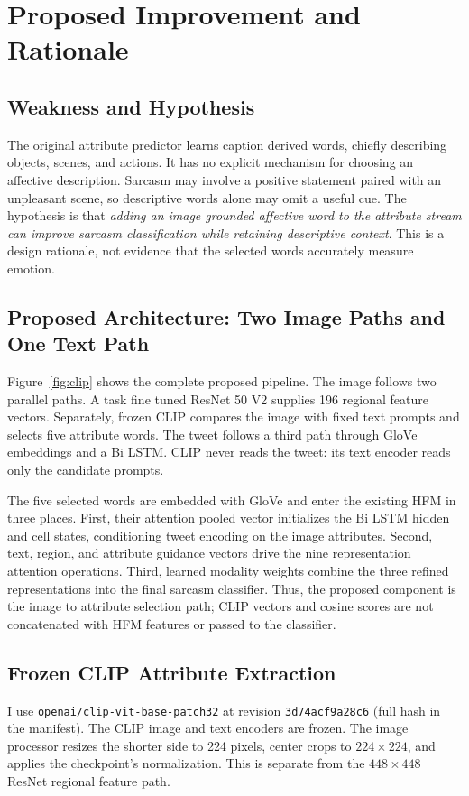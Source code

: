 \documentclass[conference]{IEEEtran}
\begin{document}
\section{Proposed Improvement and Rationale}
\label{sec:improvement}
\subsection{Weakness and Hypothesis}
The original attribute predictor learns caption derived words, chiefly describing objects, scenes, and actions. It has no explicit mechanism for choosing an affective description. Sarcasm may involve a positive statement paired with an unpleasant scene, so descriptive words alone may omit a useful cue. The hypothesis is that \emph{adding an image grounded affective word to the attribute stream can improve sarcasm classification while retaining descriptive context}. This is a design rationale, not evidence that the selected words accurately measure emotion.

\subsection{Proposed Architecture: Two Image Paths and One Text Path}
Figure~\ref{fig:clip} shows the complete proposed pipeline. The image follows two parallel paths. A task fine tuned ResNet 50 V2 supplies 196 regional feature vectors. Separately, frozen CLIP compares the image with fixed text prompts and selects five attribute words. The tweet follows a third path through GloVe embeddings and a Bi LSTM. CLIP never reads the tweet: its text encoder reads only the candidate prompts.

The five selected words are embedded with GloVe and enter the existing HFM in three places. First, their attention pooled vector initializes the Bi LSTM hidden and cell states, conditioning tweet encoding on the image attributes. Second, text, region, and attribute guidance vectors drive the nine representation attention operations. Third, learned modality weights combine the three refined representations into the final sarcasm classifier. Thus, the proposed component is the image to attribute selection path; CLIP vectors and cosine scores are not concatenated with HFM features or passed to the classifier.

\subsection{Frozen CLIP Attribute Extraction}
I use \texttt{openai/clip-vit-base-patch32} at revision \texttt{3d74acf9a28c6} (full hash in the manifest). The CLIP image and text encoders are frozen. The image processor resizes the shorter side to 224 pixels, center crops to $224\times224$, and applies the checkpoint's normalization. This is separate from the $448\times448$ ResNet regional feature path.
\end{document}
